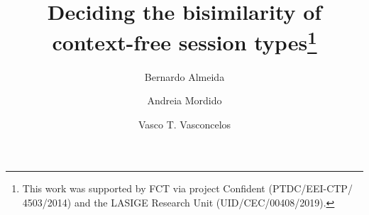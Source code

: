 \documentclass[runningheads]{llncs}
\begin{document}
\title{Deciding the bisimilarity of context-free session types\thanks{This work was supported by FCT via project Confident
 (PTDC/EEI-CTP/ 4503/2014) and the LASIGE Research Unit
 (UID/CEC/00408/2019).}}


\author{Bernardo Almeida \and
Andreia Mordido \and
Vasco T. Vasconcelos}

%
%



%
%
%




\maketitle














\newpage 
\appendix

%
%
%
%
\end{document}
